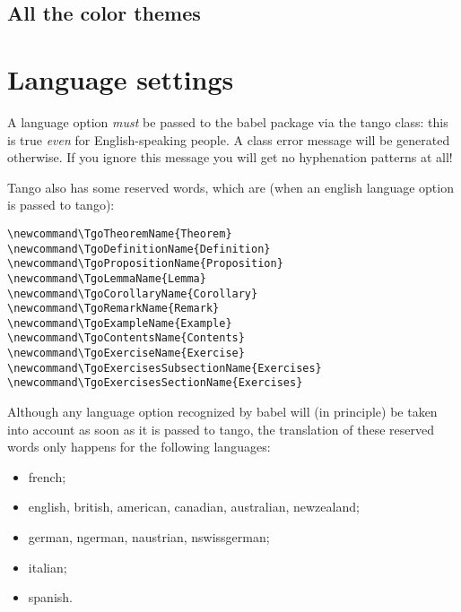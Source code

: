 \documentclass[english,ColorTheme=Red,FontSize=10pt]{tango}
\newcommand\TO[1]{\textsf{#1}}
\begin{document}
\subsection{All the color themes}
\indent\par
\hspace*{0pt}\hfil{}\hfil{}\hfil{}\hfil{}\hfil%
\hfil\null
\par\bigskip\par
\hspace*{0pt}\hfil{}\hfil{}\hfil{}\hfil{}\hfil{}\hfil\null
\par\bigskip\par
\hspace*{0pt}\hfil{}\hfil{}\hfil{}\hfil{}\hfil{}\hfil\null

\section{Language settings}\label{lang}
A language option \emph{must} be passed to the \TO{babel} package via the tango class: this is true \emph{even} for English-speaking people. A class error message will be generated otherwise. If you ignore this message you will get no hyphenation patterns at all!

Tango also has some reserved words, which are (when an english language option is passed to tango):\begin{verbatim}
\newcommand\TgoTheoremName{Theorem}
\newcommand\TgoDefinitionName{Definition}
\newcommand\TgoPropositionName{Proposition}
\newcommand\TgoLemmaName{Lemma}
\newcommand\TgoCorollaryName{Corollary}
\newcommand\TgoRemarkName{Remark}
\newcommand\TgoExampleName{Example}
\newcommand\TgoContentsName{Contents}
\newcommand\TgoExerciseName{Exercise}
\newcommand\TgoExercisesSubsectionName{Exercises}
\newcommand\TgoExercisesSectionName{Exercises}
\end{verbatim}

Although any language option recognized by babel will (in principle) be taken into account as soon as it is passed to tango, the translation of these reserved words only happens for the following languages: 
\begin{itemize}
\item\TO{french};
\item\TO{english, british, american, canadian, australian, newzealand};
\item\TO{german, ngerman, naustrian, nswissgerman};
\item\TO{italian};
\item\TO{spanish}.
\end{itemize}
\end{document}
